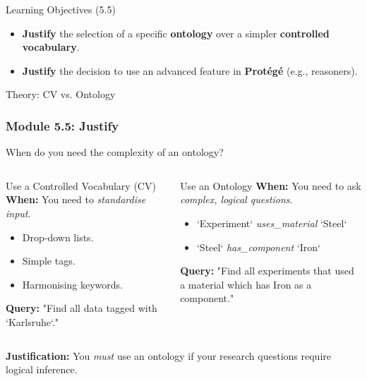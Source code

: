 \begin{frame}{Learning Objectives (5.5)}
    \begin{itemize}
        \item \textbf{Justify} the selection of a specific \textbf{ontology} over a simpler \textbf{controlled vocabulary}.
        \item \textbf{Justify} the decision to use an advanced feature in \textbf{Protégé} (e.g., reasoners).
    \end{itemize}
\end{frame}
\begin{frame}{Theory: CV vs. Ontology}
    \frametitle{Module 5.5: Justify}
    When do you need the complexity of an ontology?
    
    \begin{columns}
        \begin{block}{Use a Controlled Vocabulary (CV)}
            \textbf{When:} You need to \emph{standardise input}.
            \begin{itemize}
                \item Drop-down lists.
                \item Simple tags.
                \item Harmonising keywords.
            \end{itemize}
            \textbf{Query:} "Find all data tagged with `Karlsruhe`."
        \end{block}
        
        \begin{block}{Use an Ontology}
            \textbf{When:} You need to ask \emph{complex, logical questions}.
            \begin{itemize}
                \item `Experiment` \emph{uses\_material} `Steel`
                \item `Steel` \emph{has\_component} `Iron`
            \end{itemize}
            \textbf{Query:} "Find all experiments that used a material which has Iron as a component."
        \end{block}
    \end{columns}
    \pause
    \textbf{Justification:} You \textit{must} use an ontology if your research questions require logical inference.
\end{frame}

